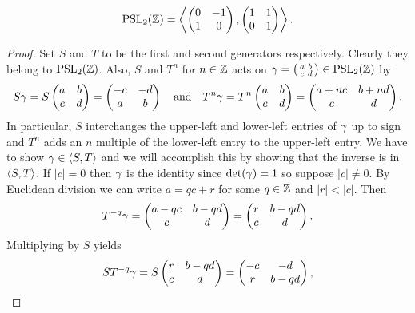     \begin{proposition}\label{prop:PSL_generator}
        \[
          \mathrm{PSL}_{2}(\mathbb{Z}) = \left\langle\begin{pmatrix} 0 &-1 \\ 1 & 0 \end{pmatrix},\begin{pmatrix} 1 & 1 \\ 0 & 1 \end{pmatrix} \right\rangle.
        \]
    \end{proposition}
    \begin{proof}
      Set $S$ and $T$ to be the first and second generators respectively. Clearly they belong to $\mathrm{PSL}_{2}(\mathbb{Z})$. Also, $S$ and $T^{n}$ for $n \in \mathbb{Z}$ acts on $\gamma = \begin{psmallmatrix} a & b \\ c & d \end{psmallmatrix} \in \mathrm{PSL}_{2}(\mathbb{Z})$ by
      \[
        S\gamma = S\begin{pmatrix} a & b \\ c & d \end{pmatrix} = \begin{pmatrix} -c & -d \\ a & b \end{pmatrix} \quad \text{and} \quad T^{n}\gamma = T^{n}\begin{pmatrix} a & b \\ c & d \end{pmatrix} = \begin{pmatrix} a+nc & b+nd \\ c & d \end{pmatrix}.
      \]
      In particular, $S$ interchanges the upper-left and lower-left entries of $\gamma$ up to sign and $T^{n}$ adds an $n$ multiple of the lower-left entry to the upper-left entry. We have to show $\gamma \in \langle S,T\rangle$ and we will accomplish this by showing that the inverse is in $\langle S,T\rangle$. If $|c| = 0$ then $\gamma$ is the identity since $\det(\gamma) = 1$ so suppose $|c| \neq 0$. By Euclidean division we can write $a = qc+r$ for some $q \in \mathbb{Z}$ and $|r| < |c|$. Then
      \[
        T^{-q}\gamma = \begin{pmatrix} a-qc & b-qd \\ c & d \end{pmatrix} = \begin{pmatrix} r & b-qd \\ c & d \end{pmatrix}.
      \]
      Multiplying by $S$ yields
      \[
        ST^{-q}\gamma = S\begin{pmatrix} r & b-qd \\ c & d \end{pmatrix} = \begin{pmatrix} -c & -d \\ r & b-qd \end{pmatrix},
\]
\end{proof}
